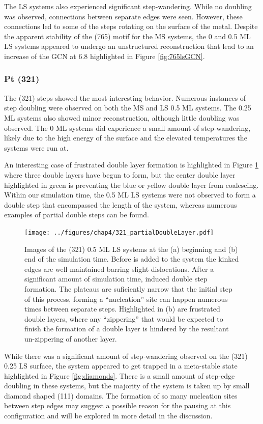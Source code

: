 The LS systems also experienced significant step-wandering. While no doubling
was observed, connections between separate edges were seen. However, these
connections led to some of the steps rotating on the surface of the metal.
Despite the apparent stability of the (765) motif for the MS systems, the 0 and
0.5 ML LS systems appeared to undergo an unstructured reconstruction that lead
to an increase of the GCN at 6.8 highlighted in Figure \ref{fig:765lsGCN}.

\subsubsection{Pt (321)}
The (321) steps showed the most interesting behavior. Numerous instances of
step doubling were observed on both the MS and LS 0.5 ML systems. The 0.25 ML
systems also showed minor reconstruction, although little doubling
was observed. The 0 ML systems did experience a small amount of step-wandering,
likely due to the high energy of the surface and the elevated temperatures the
systems were run at.

An interesting case of frustrated double layer formation is highlighted in
Figure \ref{fig:partialDoubleLayer} where three double layers have begun to
form, but the center double layer highlighted in green is preventing the blue
or yellow double layer from coalescing. Within our simulation time, the 0.5 ML
LS systems were not observed to form a double step that encompassed the length
of the system, whereas numerous examples of partial double steps can be found.

\begin{figure}
\centering
\texttt{[image: ../figures/chap4/321\_partialDoubleLayer.pdf]}
\caption{Images of the (321) 0.5 ML LS systems at the (a) beginning and
(b) end of the simulation time. Before  is added to the system the
kinked edges are well maintained barring slight dislocations. After a
significant amount of simulation time,  induced double step formation.
The plateaus are suficiently narrow that the initial step of this process, forming a
``nucleation'' site can happen numerous times between separate steps.
Highlighted in (b) are frustrated double layers, where any ``zippering'' that
would be expected to finish the formation of a double layer is hindered by the
resultant un-zippering of another layer.}
\label{fig:partialDoubleLayer}
\end{figure}

While there was a significant amount of step-wandering observed on the (321)
0.25 LS surface, the system appeared to get trapped in a meta-stable state
highlighted in Figure \ref{fig:diamonds}. There is a small amount of step-edge
doubling in these systems, but the majority of the system is taken up by small
diamond shaped (111) domains. The formation of so many nucleation sites between
step edges may suggest a possible reason for the pausing at this configuration
and will be explored in more detail in the discussion.

